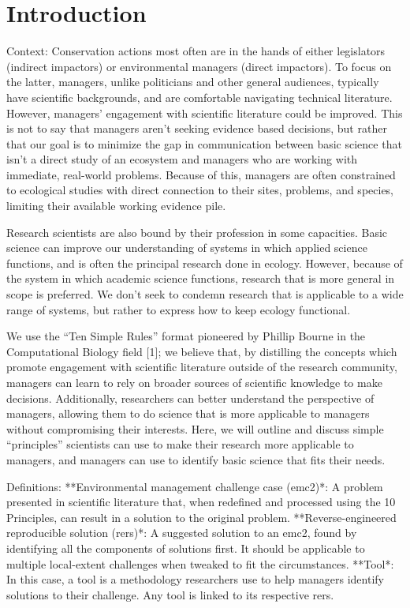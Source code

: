 \documentclass[10pt,letterpaper]{article}
\begin{document}
\linenumbers

\section{Introduction}\label{introduction}

Context: Conservation actions most often are in the hands of either
legislators (indirect impactors) or environmental managers (direct
impactors). To focus on the latter, managers, unlike politicians and
other general audiences, typically have scientific backgrounds, and are
comfortable navigating technical literature. However, managers'
engagement with scientific literature could be improved. This is not to
say that managers aren't seeking evidence based decisions, but rather
that our goal is to minimize the gap in communication between basic
science that isn't a direct study of an ecosystem and managers who are
working with immediate, real-world problems. Because of this, managers
are often constrained to ecological studies with direct connection to
their sites, problems, and species, limiting their available working
evidence pile.

Research scientists are also bound by their profession in some
capacities. Basic science can improve our understanding of systems in
which applied science functions, and is often the principal research
done in ecology. However, because of the system in which academic
science functions, research that is more general in scope is preferred.
We don't seek to condemn research that is applicable to a wide range of
systems, but rather to express how to keep ecology functional.

We use the ``Ten Simple Rules'' format pioneered by Phillip Bourne in
the Computational Biology field {[}1{]}; we believe that, by distilling
the concepts which promote engagement with scientific literature outside
of the research community, managers can learn to rely on broader sources
of scientific knowledge to make decisions. Additionally, researchers can
better understand the perspective of managers, allowing them to do
science that is more applicable to managers without compromising their
interests. Here, we will outline and discuss simple ``principles''
scientists can use to make their research more applicable to managers,
and managers can use to identify basic science that fits their needs.

Definitions: **Environmental management challenge case (emc2)*: A
problem presented in scientific literature that, when redefined and
processed using the 10 Principles, can result in a solution to the
original problem. **Reverse-engineered reproducible solution (rers)*: A
suggested solution to an emc2, found by identifying all the components
of solutions first. It should be applicable to multiple local-extent
challenges when tweaked to fit the circumstances. **Tool*: In this case,
a tool is a methodology researchers use to help managers identify
solutions to their challenge. Any tool is linked to its respective rers.
\end{document}
